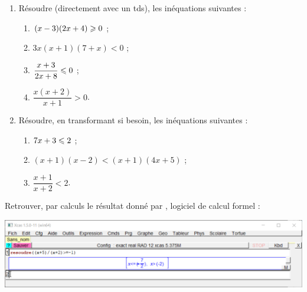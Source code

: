 \documentclass[a4paper,11pt]{article}
\begin{document}
\medskip


\begin{enumerate}
	\item Résoudre (directement avec un tds), les inéquations suivantes :
	\begin{enumerate}
		\item $(x-3)(2x+4) \geqslant 0$ ;
		\item $3x(x+1)(7+x) < 0$ ;
		\item $\dfrac{x+3}{2x+8} \leqslant 0$ ;
		\item $\dfrac{x(x+2)}{x+1} > 0$.
	\end{enumerate}
	\item Résoudre, en transformant si besoin, les inéquations suivantes :
	\begin{enumerate}
		\item $7x+3 \leqslant 2$ ;
		\item $(x+1)(x-2) < (x+1)(4x+5)$ ;
		\item $\dfrac{x+1}{x+2} < 2$.
	\end{enumerate}
\end{enumerate}

\medskip


\medskip

Retrouver, par \og calculs \fg{} le résultat donné par , logiciel de calcul formel :
%
\begin{center}
	\includegraphics[scale=0.7]{chap03_td_xcas}
\end{center}
\end{document}

